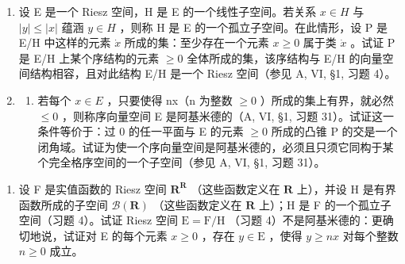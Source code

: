 \begin{enumerate}
\def\labelenumi{\arabic{enumi})}
\setcounter{enumi}{3}
\item
  设 E 是一个 Riesz 空间，H 是 E 的一个线性子空间。若关系 \(x \in H\) 与 \(|y| \leqslant |x|\) 蕴涵 \(y \in H\) ，则称 H 是 E 的一个孤立子空间。在此情形，设 P 是 E/H 中这样的元素 \(\dot{x}\) 所成的集：至少存在一个元素 \(x \geqslant 0\) 属于类 \(\dot{x}\) 。试证 P 是 E/H 上某个序结构的元素 \(\geqslant 0\) 全体所成的集，该序结构与 E/H 的向量空间结构相容，且对此结构 E/H 是一个 Riesz 空间（参见 A, VI, §1, 习题 4）。
\item
  \begin{enumerate}
  \def\labelenumii{\alph{enumii})}
  \tightlist
  \item
    若每个 \(x \in E\) ，只要使得 nx（n 为整数 \(\geqslant 0\) ）所成的集上有界，就必然 \(\leqslant 0\) ，则称序向量空间 E 是阿基米德的（A, VI, §1, 习题 31）。试证这一条件等价于：过 0 的任一平面与 E 的元素 \(\geqslant 0\) 所成的凸锥 P 的交是一个闭角域。试证为使一个序向量空间是阿基米德的，必须且只须它同构于某个完全格序空间的一个子空间（参见 A, VI, §1, 习题 31）。
  \end{enumerate}
\end{enumerate}

\begin{enumerate}
\def\labelenumi{\alph{enumi})}
\setcounter{enumi}{1}
\tightlist
\item
  设 F 是实值函数的 Riesz 空间 \(\mathbf{R}^{\mathbf{R}}\) （这些函数定义在 \(\mathbf{R}\) 上），并设 H 是有界函数所成的子空间 \(\mathcal{B}(\mathbf{R})\) （这些函数定义在 \(\mathbf{R}\) 上）；H 是 F 的一个孤立子空间（习题 4）。试证 Riesz 空间 \(\mathrm{E} = \mathrm{F} / \mathrm{H}\) （习题 4）不是阿基米德的：更确切地说，试证对 E 的每个元素 \(x \geqslant 0\) ，存在 \(y \in \mathrm{E}\) ，使得 \(y \geqslant nx\) 对每个整数 \(n \geqslant 0\) 成立。
\end{enumerate}

